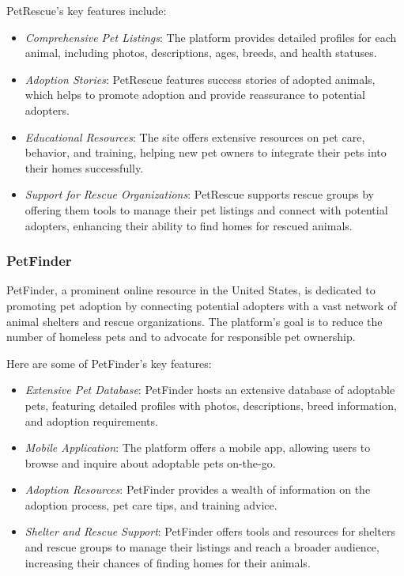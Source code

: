 PetRescue's key features include:

\begin{itemize}
  \item \textit{Comprehensive Pet Listings}: The platform provides detailed profiles for each animal, including photos, descriptions, ages, breeds, and health statuses.
  \item \textit{Adoption Stories}: PetRescue features success stories of adopted animals, which helps to promote adoption and provide reassurance to potential adopters.
  \item \textit{Educational Resources}: The site offers extensive resources on pet care, behavior, and training, helping new pet owners to integrate their pets into their homes successfully.
  \item \textit{Support for Rescue Organizations}: PetRescue supports rescue groups by offering them tools to manage their pet listings and connect with potential adopters, enhancing their ability to find homes for rescued animals.
\end{itemize}


\subsubsection*{PetFinder}

PetFinder, a prominent online resource in the United States, is dedicated to promoting pet adoption by connecting potential adopters with a vast network of animal shelters and rescue organizations. The platform's goal is to reduce the number of homeless pets and to advocate for responsible pet ownership.

Here are some of PetFinder's key features:

\begin{itemize}
  \item \textit{Extensive Pet Database}: PetFinder hosts an extensive database of adoptable pets, featuring detailed profiles with photos, descriptions, breed information, and adoption requirements.
  \item \textit{Mobile Application}: The platform offers a mobile app, allowing users to browse and inquire about adoptable pets on-the-go.
  \item \textit{Adoption Resources}: PetFinder provides a wealth of information on the adoption process, pet care tips, and training advice.
  \item \textit{Shelter and Rescue Support}: PetFinder offers tools and resources for shelters and rescue groups to manage their listings and reach a broader audience, increasing their chances of finding homes for their animals.
\end{itemize}


